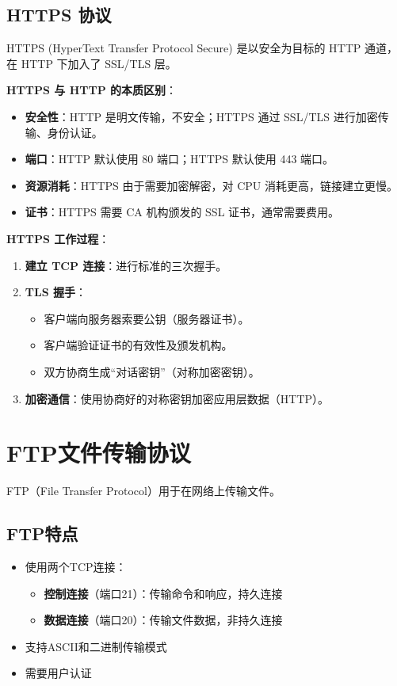 \subsection{HTTPS 协议}
HTTPS (HyperText Transfer Protocol Secure) 是以安全为目标的 HTTP 通道，在 HTTP 下加入了 SSL/TLS 层。

\textbf{HTTPS 与 HTTP 的本质区别}：
\begin{itemize}[itemsep=0pt]
    \item \textbf{安全性}：HTTP 是明文传输，不安全；HTTPS 通过 SSL/TLS 进行加密传输、身份认证。
    \item \textbf{端口}：HTTP 默认使用 80 端口；HTTPS 默认使用 443 端口。
    \item \textbf{资源消耗}：HTTPS 由于需要加密解密，对 CPU 消耗更高，链接建立更慢。
    \item \textbf{证书}：HTTPS 需要 CA 机构颁发的 SSL 证书，通常需要费用。
\end{itemize}

\textbf{HTTPS 工作过程}：
\begin{enumerate}[leftmargin=2em,itemsep=0pt]
    \item \textbf{建立 TCP 连接}：进行标准的三次握手。
    \item \textbf{TLS 握手}：
    \begin{itemize}[itemsep=0pt]
        \item 客户端向服务器索要公钥（服务器证书）。
        \item 客户端验证证书的有效性及颁发机构。
        \item 双方协商生成“对话密钥”（对称加密密钥）。
    \end{itemize}
    \item \textbf{加密通信}：使用协商好的对称密钥加密应用层数据（HTTP）。
\end{enumerate}

\section{FTP文件传输协议}
FTP（File Transfer Protocol）用于在网络上传输文件。

\subsection{FTP特点}
\begin{itemize}[leftmargin=2em,itemsep=0pt]
    \item 使用两个TCP连接：
    \begin{itemize}[itemsep=0pt]
        \item \textbf{控制连接}（端口21）：传输命令和响应，持久连接
        \item \textbf{数据连接}（端口20）：传输文件数据，非持久连接
    \end{itemize}
    \item 支持ASCII和二进制传输模式
    \item 需要用户认证
\end{itemize}

